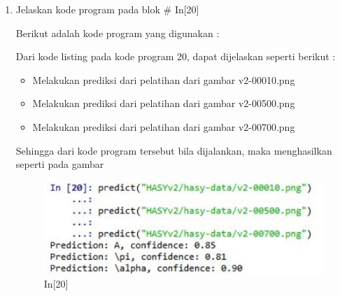 \begin{enumerate}
\item Jelaskan kode program pada blok \# In[20]
\par Berikut adalah kode program yang digunakan :

\par Dari kode listing pada kode program 20, dapat dijelaskan seperti berikut :
\begin{itemize}
\item Melakukan prediksi dari pelatihan dari gambar v2-00010.png
\item Melakukan prediksi dari pelatihan dari gambar v2-00500.png
\item Melakukan prediksi dari pelatihan dari gambar v2-00700.png
\end{itemize}
\par Sehingga dari kode program tersebut bila dijalankan, maka menghasilkan seperti pada gambar 
\begin{figure}[!htbp]
	\centerline{\includegraphics[width=1\textwidth]{figures/andi/p20.PNG}}
	\caption{In[20]}
\end{figure}
\end{enumerate}

